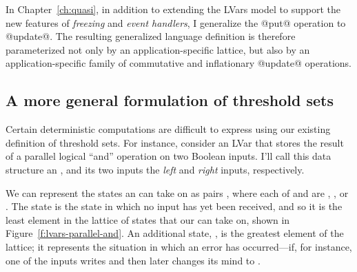 In Chapter~\ref{ch:quasi}, in addition to extending the LVars model to
support the new features of \emph{freezing} and \emph{event handlers},
I generalize the @put@ operation to @update@.  The resulting
generalized language definition is therefore parameterized not only by
an application-specific lattice, but also by an application-specific
family of commutative and inflationary @update@ operations.


\subsection{A more general formulation of threshold sets}\label{subsection:lvars-a-more-general-formulation-of-threshold-sets}

Certain deterministic computations are difficult to express using our
existing definition of threshold sets.  For instance, consider an LVar
that stores the result of a parallel logical ``and'' operation on two
Boolean inputs.  I'll call this data structure an \emph{},
and its two inputs the \emph{left} and \emph{right} inputs,
respectively.

We can represent the states an  can take on as pairs
, where each of  and  are , , or
.  The  state is the state in which no input has
yet been received, and so it is the least element in the lattice of
states that our  can take on, shown in
Figure~\ref{f:lvars-parallel-and}.  An additional state, , is
the greatest element of the lattice; it represents the situation in
which an error has occurred---if, for instance, one of the inputs
writes  and then later changes its mind to .

